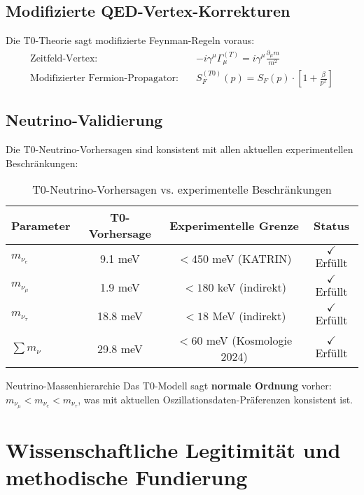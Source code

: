 \documentclass[12pt,a4paper]{article}
\begin{document}
	
	\subsection{Modifizierte QED-Vertex-Korrekturen}
	\label{subsec:qed_corrections}
	
	Die T0-Theorie sagt modifizierte Feynman-Regeln voraus:
	\begin{align}
		\text{Zeitfeld-Vertex:} \quad &-i\gamma^\mu\Gamma_\mu^{(T)} = i\gamma^\mu\frac{\partial_\mu m}{m^2} \\
		\text{Modifizierter Fermion-Propagator:} \quad &S_F^{(T0)}(p) = S_F(p) \cdot \left[1 + \frac{\beta}{p^2}\right]
	\end{align}
	
	\subsection{Neutrino-Validierung}
	\label{subsec:neutrino_validation}
	
	Die T0-Neutrino-Vorhersagen sind konsistent mit allen aktuellen experimentellen Beschränkungen:
	
	\begin{table}[H]
		\centering
		\begin{tabular}{lccc}
			\toprule
			\textbf{Parameter} & \textbf{T0-Vorhersage} & \textbf{Experimentelle Grenze} & \textbf{Status} \\
			\midrule
			$m_{\nu_e}$ & 9.1 meV & $< 450$ meV (KATRIN) & $\checkmark$ Erfüllt \\
			$m_{\nu_\mu}$ & 1.9 meV & $< 180$ keV (indirekt) & $\checkmark$ Erfüllt \\
			$m_{\nu_\tau}$ & 18.8 meV & $< 18$ MeV (indirekt) & $\checkmark$ Erfüllt \\
			$\sum m_\nu$ & 29.8 meV & $< 60$ meV (Kosmologie 2024) & $\checkmark$ Erfüllt \\
			\bottomrule
		\end{tabular}
		\caption{T0-Neutrino-Vorhersagen vs. experimentelle Beschränkungen}
		\label{tab:neutrino_validation}
	\end{table}
	
	\begin{important}{Neutrino-Massenhierarchie}{}
		Das T0-Modell sagt \textbf{normale Ordnung} vorher: $m_{\nu_\mu} < m_{\nu_e} < m_{\nu_\tau}$, was mit aktuellen Oszillationsdaten-Präferenzen konsistent ist.
	\end{important}
	
	\section{Wissenschaftliche Legitimität und methodische Fundierung}
	\label{sec:wissenschaftliche_legitimitaet}
	
\end{document}
